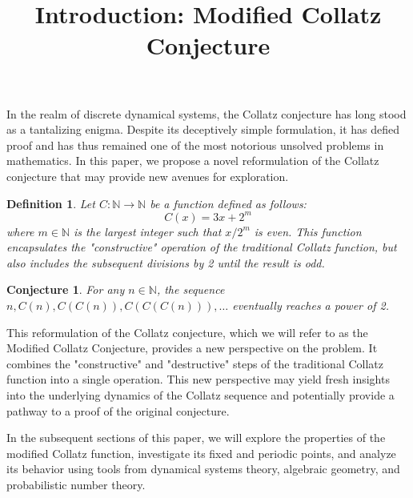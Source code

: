 \documentclass{article}
\newtheorem{definition}{Definition}[section]
\newtheorem{conjecture}{Conjecture}[section]
\begin{document}
\title{Introduction: Modified Collatz Conjecture}
\maketitle

In the realm of discrete dynamical systems, the Collatz conjecture has long stood as a tantalizing enigma. Despite its deceptively simple formulation, it has defied proof and has thus remained one of the most notorious unsolved problems in mathematics. In this paper, we propose a novel reformulation of the Collatz conjecture that may provide new avenues for exploration.

\begin{definition}
Let \(C: \mathbb{N} \rightarrow \mathbb{N}\) be a function defined as follows:
\[
C(x) = 3x + 2^m
\]
where \(m \in \mathbb{N}\) is the largest integer such that \(x/2^m\) is even. This function encapsulates the "constructive" operation of the traditional Collatz function, but also includes the subsequent divisions by 2 until the result is odd.
\end{definition}

\begin{conjecture}
For any \(n \in \mathbb{N}\), the sequence \(n, C(n), C(C(n)), C(C(C(n))), \ldots\) eventually reaches a power of 2.
\end{conjecture}

This reformulation of the Collatz conjecture, which we will refer to as the Modified Collatz Conjecture, provides a new perspective on the problem. It combines the "constructive" and "destructive" steps of the traditional Collatz function into a single operation. This new perspective may yield fresh insights into the underlying dynamics of the Collatz sequence and potentially provide a pathway to a proof of the original conjecture.

In the subsequent sections of this paper, we will explore the properties of the modified Collatz function, investigate its fixed and periodic points, and analyze its behavior using tools from dynamical systems theory, algebraic geometry, and probabilistic number theory.
\end{document}
